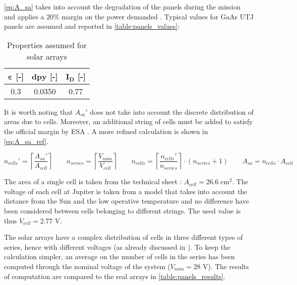 \autoref{eq:A_sa} takes into account the degradation of the panels during the mission and applies a $20\%$ margin on the power demanded \mref.
Typical values for GaAs UTJ panels are assumed and reported in \autoref{table:panels_values}:

\begin{table}[H]
    \renewcommand{\arraystretch}{1.3}
    \centering
    \begin{tabular}{|c|c|c|}
        \hline
        $\boldsymbol{\varepsilon}$ \textbf{[-]}    &
        $\boldsymbol{dpy}$ \textbf{[-]}     &
        $\boldsymbol{I_D}$ \textbf{[-]}     \\
        \hline
        \hline
        0.3 & 0.0350 & 0.77 \\
        \hline
    \end{tabular}
    \caption{Properties assumed for solar arrays \mref}
    \label{table:panels_values}
\end{table}

It is worth noting that $A_{sa}'$ does not take into account the discrete distribution of areas due to cells.
Moreover, an additional string of cells must be added to satisfy the official margin by ESA \mref.
A more refined calculation is shown in \autoref{eq:A_sa_ref}.

\begin{equation}
    n_{cells}' = \left\lceil \frac{A_{sa}'}{A_{cell}} \right\rceil \qquad
    n_{series} = \left\lceil \frac{V_{nom}}{V_{cell}} \right\rceil \qquad
    n_{cells} = \left\lceil \frac{n_{cells}'}{n_{series}} \right\rceil
                \cdot \left( n_{series} + 1 \right) \qquad
    A_{sa} = n_{cells} \cdot A_{cell}
    \label{eq:A_sa_ref}
\end{equation}

The area of a single cell is taken from the technical sheet \mref: $A_{cell} = 26.6 \; \textrm{cm}^2$.
The voltage of each cell at Jupiter is taken from a model\cite{solar_panels_coef} that takes into account the distance from the Sun and the low operative temperature and no difference have been considered between cells belonging to different strings. The used value is thus $V_{cell} = 2.77$ V.

The solar arrays have a complex distribution of cells in three different types of series, hence with different voltages (as already discussed in \mref). %
To keep the calculation simpler, an average on the number of cells in the series has been computed through the nominal voltage of the system ($V_{nom} = 28$ V).
The results of computation are compared to the real arrays in \autoref{table:panels_results}.

